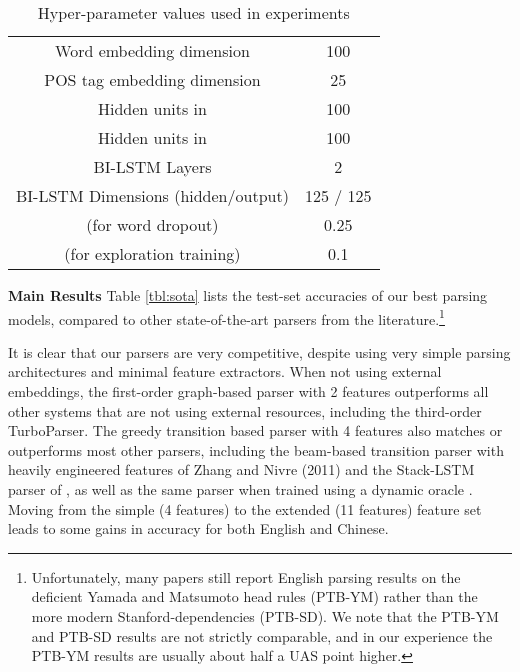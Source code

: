 \documentclass[11pt]{article}
\begin{document}
\begin{table}[ht]
\begin{center}
\begin{scalebox}{0.8}{
\begin{tabular}{ | c | c | }
\hline 
Word embedding dimension & 100 \\
POS tag embedding dimension & 25 \\
Hidden units in  & 100 \\
Hidden units in  & 100 \\
BI-LSTM Layers & 2 \\
BI-LSTM Dimensions (hidden/output)  & 125 / 125 \\
 (for word dropout) & 0.25 \\
 (for exploration training) & 0.1 \\
\hline
\end{tabular}}
\end{scalebox}
\caption{Hyper-parameter values used in experiments}
\label{tbl:hyper}
\end{center}
\end{table}

\noindent\textbf{Main Results}
Table \ref{tbl:sota} lists the test-set accuracies of our best parsing models, compared
to other state-of-the-art parsers from the literature.\footnote{Unfortunately, many
papers still report English parsing results on the deficient Yamada and
Matsumoto head rules (PTB-YM) rather than the more modern Stanford-dependencies
(PTB-SD). We note that the PTB-YM and PTB-SD results are not strictly
comparable, and in our experience the PTB-YM results are usually about half a
UAS point higher.}

It is clear that our parsers are very competitive, despite using very simple
parsing architectures and minimal feature extractors.  
When not
using external embeddings, the first-order graph-based parser with 2 features outperforms
all other systems that are not using
external resources, including the third-order TurboParser. The greedy transition
based parser with 4 features also matches or outperforms most other parsers,
including the beam-based transition parser with heavily engineered features of Zhang and
Nivre (2011) and the Stack-LSTM parser of , as well as the same parser when trained using a dynamic oracle \cite{ballesteros2016dynamic}.
Moving from the simple (4 features) to the extended (11 features) feature set
leads to some gains in accuracy for both English and Chinese.
\end{document}
